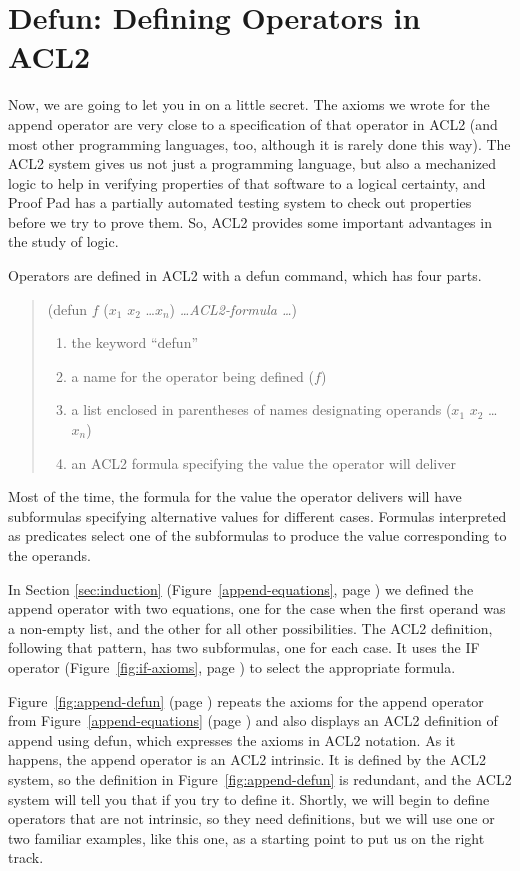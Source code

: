 \section{Defun: Defining Operators in ACL2}
\label{sec:defun}

Now, we are going to let you in on a little secret.
The axioms we wrote for the append operator are very
close to a specification of that operator in ACL2
(and most other programming languages, too, although
it is rarely done this way).
The ACL2 system gives us not just a programming language,
but also a mechanized logic to help in verifying properties of
that software to a logical certainty,
and Proof Pad has a partially automated testing system to
check out properties before we try to prove them.
So, ACL2 provides some important advantages in the study of logic.

Operators are defined in ACL2 with a defun command,
which has four parts.
\begin{quote}
(defun $f$ ($x_1$ $x_2$ \dots $x_n$) \emph{\dots ACL2-formula \dots})

\begin{enumerate}
\item the keyword ``defun''
\item a name for the operator being defined ($f$)
\item a list enclosed in parentheses of names designating operands ($x_1$ $x_2$ \dots $x_n$)
\item an ACL2 formula specifying the value the operator will deliver
\end{enumerate}
\end{quote}

Most of the time, the formula for the value the operator delivers
will have subformulas specifying alternative values for different cases.
Formulas interpreted as predicates select one of
the subformulas to produce the value corresponding to the operands.

In Section \ref{sec:induction} (Figure~\ref{append-equations}, page \pageref{append-equations})
we defined the append operator with two equations,
one for the case when the first operand was a non-empty list,
and the other for all other possibilities.
The ACL2 definition, following that pattern, has two subformulas,
one for each case.
It uses the IF operator
(Figure~\ref{fig:if-axioms}, page \pageref{fig:if-axioms})
to select the appropriate formula.

Figure~\ref{fig:append-defun} (page \pageref{fig:append-defun})
repeats the axioms for the append operator from
Figure~\ref{append-equations} (page \pageref{append-equations})
and also displays an ACL2 definition of append using defun,
which expresses the axioms in ACL2 notation.
As it happens, the append operator is an ACL2 intrinsic.
It is defined by the ACL2 system, so the definition
in Figure~\ref{fig:append-defun} is redundant,
and the ACL2 system will tell you that if you try to define it.
Shortly, we will begin to define operators that are not
intrinsic, so they need definitions,
but we will use one or two familiar examples, like this one,
as a starting point to put us on the right track.

